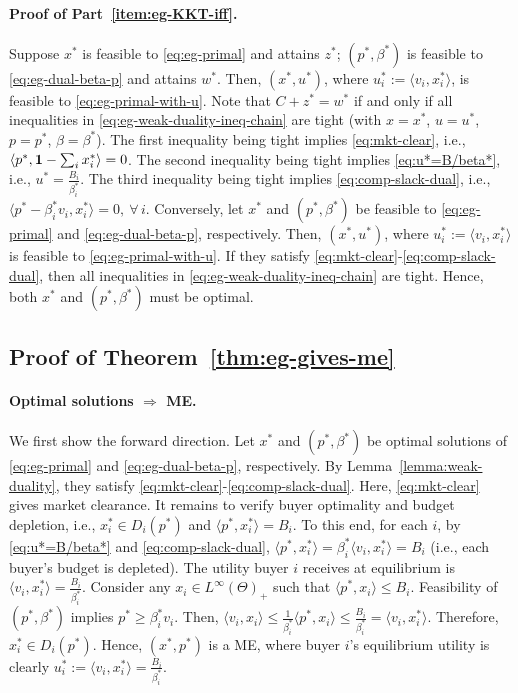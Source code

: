 	\paragraph{Proof of Part~\ref{item:eg-KKT-iff}.} 
	Suppose $x^*$ is feasible to \eqref{eq:eg-primal} and attains $z^*$; $(p^*, \beta^*)$ is feasible to \eqref{eq:eg-dual-beta-p} and attains $w^*$. 
	Then, $(x^*, u^*)$, where $u^*_i := \langle v_i, x^*_i \rangle$, is feasible to \eqref{eq:eg-primal-with-u}. Note that $C + z^* = w^*$ if and only if all inequalities in \eqref{eq:eg-weak-duality-ineq-chain} are tight (with $x = x^*$, $u = u^*$, $p = p^*$, $\beta = \beta^*$). The first inequality being tight implies \eqref{eq:mkt-clear}, i.e., 
	$ \left\langle p^*, \mathbf{1} - \sum_i x^*_i \right \rangle = 0$.
	The second inequality being tight implies \eqref{eq:u*=B/beta*}, i.e.,
	$ u^* = \frac{B_i}{\beta^*_i}$.
	The third inequality being tight implies \eqref{eq:comp-slack-dual}, i.e.,
	$ \langle p^* - \beta^*_i v_i, x^*_i \rangle = 0,\ \forall\, i$. 
	Conversely, let $x^*$ and $(p^*, \beta^*)$ be feasible to \eqref{eq:eg-primal} and \eqref{eq:eg-dual-beta-p}, respectively. Then, $(x^*, u^*)$, where $u^*_i := \langle v_i, x^*_i \rangle$ is feasible to \eqref{eq:eg-primal-with-u}. 
	If they satisfy \eqref{eq:mkt-clear}-\eqref{eq:comp-slack-dual}, then all inequalities in \eqref{eq:eg-weak-duality-ineq-chain} are tight. 
	Hence, both $x^*$ and $(p^*, \beta^*)$ must be optimal.

	\subsection*{Proof of Theorem~\ref{thm:eg-gives-me}}
	\paragraph{Optimal solutions $\Rightarrow$ ME.}
	We first show the forward direction. Let $x^*$ and $(p^*, \beta^*)$ be optimal solutions of \eqref{eq:eg-primal} and \eqref{eq:eg-dual-beta-p}, respectively. By Lemma~\ref{lemma:weak-duality}, they satisfy \eqref{eq:mkt-clear}-\eqref{eq:comp-slack-dual}.
	Here, \eqref{eq:mkt-clear} gives market clearance. 
	It remains to verify buyer optimality and budget depletion, i.e., $x^*_i \in D_i(p^*)$ and $\langle p^*, x^*_i \rangle = B_i$. 
	To this end, for each $i$, by \eqref{eq:u*=B/beta*} and \eqref{eq:comp-slack-dual},
		$\langle p^*, x^*_i\rangle  = \beta^*_i \langle v_i, x^*_i\rangle = B_i$ (i.e., each buyer's budget is depleted). The utility buyer $i$ receives at equilibrium is
	 $\langle v_i, x^*_i\rangle = \frac{B_i}{\beta^*_i}$. 
	Consider any $x_i\in L^\infty(\Theta)_+$ such that $\langle p^*, x_i \rangle \leq B_i$. Feasibility of $(p^*, \beta^*)$ implies $p^* \geq \beta^*_i v_i$. Then,
	$ \langle v_i, x_i\rangle \leq \frac{1}{\beta^*_i} \langle p^*, x_i \rangle \leq \frac{B_i}{\beta^*_i} = \langle v_i, x^*_i \rangle$.
	Therefore, 
	$x^*_i \in D_i(p^*)$.
	Hence, $(x^*, p^*)$ is a ME, where buyer $i$'s equilibrium utility is clearly $u^*_i := \langle v_i, x^*_i \rangle = \frac{B_i}{\beta^*_i}$.
	
